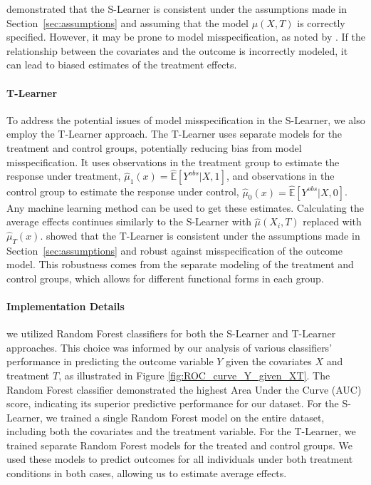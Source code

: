 \documentclass{article}
\begin{document}
\citet{hahn1998role} demonstrated that the S-Learner is consistent under the assumptions made in Section~\ref{sec:assumptions} and assuming that the model $\mu(X,T)$ is correctly specified. However, it may be prone to model misspecification, as noted by \citet{rubin1979using}. If the relationship between the covariates and the outcome is incorrectly modeled, it can lead to biased estimates of the treatment effects.

\paragraph{T-Learner} To address the potential issues of model misspecification in the S-Learner, we also employ the T-Learner approach. The T-Learner uses separate models for the treatment and control groups, potentially reducing bias from model misspecification. It uses observations in the treatment group to estimate the response under treatment, $\hat\mu_1(x) = \hat{\mathbb{E}}[Y^{obs} | X, 1]$, and observations in the control group to estimate the response under control, $\hat\mu_0(x) = \hat{\mathbb{E}}[Y^{obs} | X, 0]$. Any machine learning method can be used to get these estimates. Calculating the average effects continues similarly to the S-Learner with $\hat \mu (X_i, T)$ replaced with $\hat \mu_T(x)$.
\citet{greenland1986identifiability} showed that the T-Learner is consistent under the assumptions made in Section~\ref{sec:assumptions} and robust against misspecification of the outcome model. This robustness comes from the separate modeling of the treatment and control groups, which allows for different functional forms in each group.

\paragraph{Implementation Details}  we utilized Random Forest classifiers for both the S-Learner and T-Learner approaches. This choice was informed by our analysis of various classifiers' performance in predicting the outcome variable $Y$ given the covariates $X$ and treatment $T$, as illustrated in Figure \ref{fig:ROC_curve_Y_given_XT}. The Random Forest classifier demonstrated the highest Area Under the Curve (AUC) score, indicating its superior predictive performance for our dataset.
For the S-Learner, we trained a single Random Forest model on the entire dataset, including both the covariates and the treatment variable. For the T-Learner, we trained separate Random Forest models for the treated and control groups. We used these models to predict outcomes for all individuals under both treatment conditions in both cases, allowing us to estimate average effects.
\end{document}
